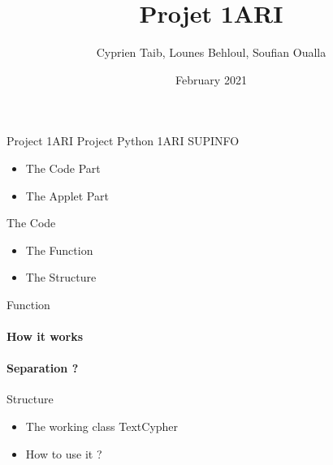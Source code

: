 \documentclass{beamer}
\title{Projet 1ARI}
\author{Cyprien Taib, Lounes Behloul, Soufian Oualla}
\date{February 2021}
\begin{document}
	
    \begin{frame}{Project 1ARI}
        \Large Project Python 1ARI SUPINFO
        \begin{center}
            \small{
                \begin{itemize}
                    \item The Code Part 
                    \item The Applet Part 
                \end{itemize}
            }
        \end{center}
	\end{frame}
    
    \begin{frame}{The Code}
        \begin{center}
            \small{
                \begin{itemize}
                    \item The Function 
                    \item The Structure
                \end{itemize}
            }
        \end{center}

    \end{frame}

    \begin{frame}{Function}
        \paragraph{How it works}
        \paragraph{Separation ?}
        
    \end{frame}

    \begin{frame}{Structure}
        \begin{center}
            \small{
                \begin{itemize}
                    \item The working class TextCypher
                    \item How to use it ?
                \end{itemize}
            }
        \end{center}
    \end{frame}
\end{document}
